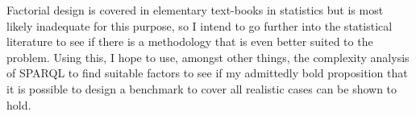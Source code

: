 \documentclass{llncs}
\begin{document}
Factorial design is covered in elementary text-books in
statistics but is most likely inadequate for this purpose, so I intend
to go further into the statistical literature to see if there is a
methodology that is even better suited to the problem. Using
this, I hope to use, amongst other things, the complexity analysis of
SPARQL to find suitable factors to see if my admittedly bold
proposition that it is possible to design a benchmark to cover all
realistic cases can be shown to hold.




%
%


\end{document}
